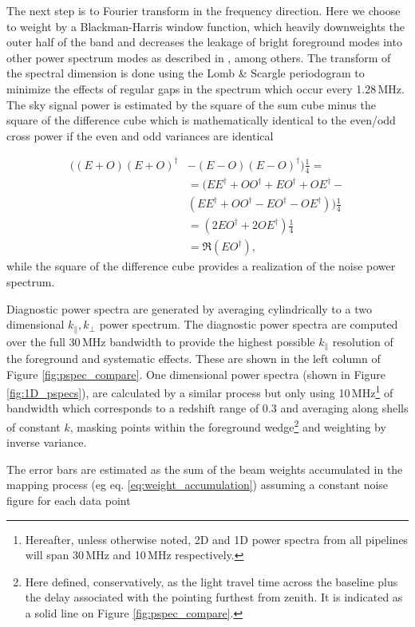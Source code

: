 \documentclass[twolcolumn,iop]{emulateapj}
\begin{document}
The next step is to Fourier transform in the frequency direction. Here we choose to weight by a Blackman-Harris window function, which heavily downweights the outer half of the band and decreases the leakage of bright foreground modes into other power spectrum modes as described in \cite{Thyagarajan:2013p10039,Parsons:2012p8896,Vedantham:2012p9026}, among others.  The transform of the spectral dimension is done using the Lomb \& Scargle periodogram to minimize the effects of regular gaps in the spectrum which occur every 1.28\,MHz.    The sky signal power is  estimated by the square of the sum cube minus the square of the difference cube which  is mathematically identical to the even/odd cross power if the even and odd variances are identical

\begin{equation}
\begin{split}
((E + O) (E+O)^\dag &- (E-O)(E-O)^\dag)\frac{1}{4} = \\
 &= (EE^\dag + OO^\dag + EO^\dag + OE^\dag - \\
		& (EE^\dag+OO^\dag - EO^\dag - OE^\dag) )\frac{1}{4} \\
&= (2EO^\dag + 2OE^\dag)\frac{1}{4} \\
&=\Re(EO^\dag),
\end{split}
\end{equation}
while the square of the difference cube provides a realization of the noise power spectrum. 


Diagnostic power spectra are generated by averaging cylindrically to a two dimensional $k_{\|},k_{\bot}$ power spectrum. The diagnostic power spectra are computed over the full 30\,MHz bandwidth to provide the highest possible $k_\parallel$ resolution of the foreground and systematic effects.  These are shown in the left column of Figure \ref{fig:pspec_compare}.  One dimensional power spectra (shown in Figure \ref{fig:1D_pspecs}), are calculated by a similar process but only using 10\,MHz\footnote{Hereafter,  unless otherwise noted, 2D and 1D power spectra from all pipelines will span 30\,MHz and 10\,MHz respectively.}  of bandwidth which corresponds to a redshift range of 0.3 and averaging along shells of constant $k$, masking points within the foreground wedge\footnote{Here defined, conservatively, as the light travel time across the baseline plus the delay associated with the pointing furthest from zenith. It is indicated as a solid line on Figure \ref{fig:pspec_compare}.} and weighting by inverse variance. 

The error bars are estimated as the sum of the beam weights accumulated in the mapping process (eg eq. \ref{eq:weight_accumulation}) assuming a constant noise figure for each data point
\end{document}
